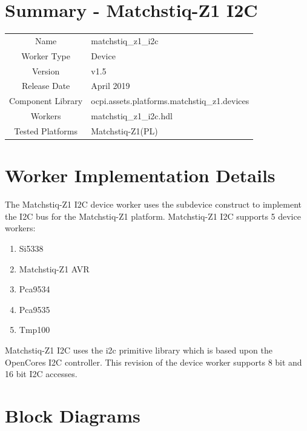 \documentclass{article}
\author{} %
\date{Version \docVersion} %
\title{\docTitle}
\def\docVersion{1.5}
\def\comp{matchstiq\_z1\_i2c}
\def\Comp{Matchstiq-Z1 I2C}
\begin{document}
\section*{Summary - \Comp}
\begin{tabular}{|c|M{13.5cm}|}
	\hline
	                  &                                        \\
	\hline
	Name              & \comp                                  \\
	\hline
	Worker Type       & Device                                 \\
	\hline
	Version           & v\docVersion \\
	\hline
	Release Date      & April 2019 \\
	\hline
	Component Library & ocpi.assets.platforms.matchstiq\_z1.devices \\
	\hline
	Workers           & \comp.hdl                              \\
	\hline
	Tested Platforms  & Matchstiq-Z1(PL)                       \\
	\hline
\end{tabular}

\section*{Worker Implementation Details}
The Matchstiq-Z1 I2C device worker uses the subdevice construct to implement the I2C bus for the Matchstiq-Z1 platform. Matchstiq-Z1 I2C supports 5 device workers:
\begin{enumerate}
	\item Si5338
	\item Matchstiq-Z1 AVR
	\item Pca9534
	\item Pca9535
	\item Tmp100
\end{enumerate}
Matchstiq-Z1 I2C uses the i2c primitive library which is based upon the OpenCores I2C controller. This revision of the device worker supports 8 bit and 16 bit I2C accesses.

\section*{Block Diagrams}
\end{document}
